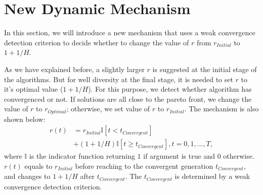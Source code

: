 \documentclass[conference]{IEEEtran}
\begin{document}
% 
\section{New Dynamic Mechanism}
In this section,
we will introduce a new mechanism that uses a weak convergence detection criterion to 
decide whether to change the value of $r$ from $r_{Initial}$ to $1+1/H$. 

As we have explained before, 
a slightly larger $r$ is suggested at the initial stage of the algorithms. 
But for well diversity at the final stage,
it is needed to set $r$ to it's optimal value ($1+1/H$). 
For this purpose, we detect whether algorithm has convergenced or not.  
If solutions are all close to the pareto front, 
we change the value of $r$ to $r_{Optimal}$; otherwise, we set value of $r$ to 
$r_{Initial}$. The mechanism is also shown below:
\begin{equation}\begin{aligned}\label{endm1}
  r(t)&=r_{Initial}\mathbb{I}\left[t<t_{Convergent}\right]\\
  &+(1+1/H)\mathbb{I}\left[t \ge t_{Convergent}\right], t=0,1,\dots,T,
\end{aligned}
\end{equation}
where $\mathbb{I}$ is the indicator function returning $1$ if argument is true and $0$ otherwise.
$r(t)$ equals to $r_{Initial}$ before reaching to the convergent generation $t_{Convergent}$,
and changes to $1+1/H$ after $t_{Convergent}$. 
The $t_{Convergent}$ is determined by a weak convergence detection criterion. 

%
%
%
\end{document}
